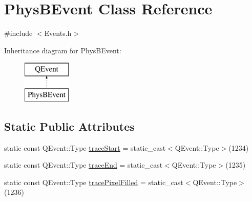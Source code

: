 \hypertarget{class_phys_b_event}{\section{Phys\-B\-Event Class Reference}
\label{class_phys_b_event}
}


{\ttfamily \#include $<$Events.\-h$>$}

Inheritance diagram for Phys\-B\-Event\-:\begin{figure}[H]
\begin{center}
\leavevmode
\includegraphics[height=2.000000cm]{class_phys_b_event}
\end{center}
\end{figure}
\subsection*{Static Public Attributes}
\begin{DoxyCompactItemize}
\item 
static const Q\-Event\-::\-Type \hyperlink{class_phys_b_event_a7ab5c424201f6461af7721d81310968c}{trace\-Start} = static\-\_\-cast$<$Q\-Event\-::\-Type$>$(1234)
\item 
static const Q\-Event\-::\-Type \hyperlink{class_phys_b_event_a56d494f3a63d0b992c8083a3fb3a8a4c}{trace\-End} = static\-\_\-cast$<$Q\-Event\-::\-Type$>$(1235)
\item 
static const Q\-Event\-::\-Type \hyperlink{class_phys_b_event_a189bab4e3463356d8ef0020562a0ea53}{trace\-Pixel\-Filled} = static\-\_\-cast$<$Q\-Event\-::\-Type$>$(1236)
\end{DoxyCompactItemize}



